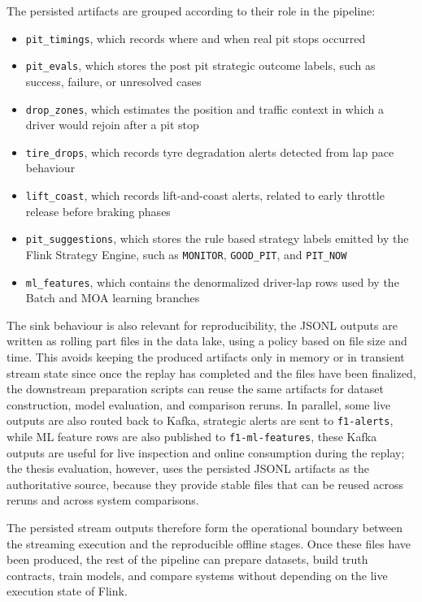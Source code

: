 The persisted artifacts are grouped according to their role in the pipeline:
\begin{itemize}
    \item \texttt{pit\_timings}, which records where and when real pit stops occurred
    \item \texttt{pit\_evals}, which stores the post pit strategic outcome labels, such as success, failure, or unresolved cases
    \item \texttt{drop\_zones}, which estimates the position and traffic context in which a driver would rejoin after a pit stop
    \item \texttt{tire\_drops}, which records tyre degradation alerts detected from lap pace behaviour
    \item \texttt{lift\_coast}, which records lift-and-coast alerts, related to early throttle release before braking phases
    \item \texttt{pit\_suggestions}, which stores the rule based strategy labels emitted by the Flink Strategy Engine, such as \texttt{MONITOR}, \texttt{GOOD\_PIT}, and \texttt{PIT\_NOW}
    \item \texttt{ml\_features}, which contains the denormalized driver-lap rows used by the Batch and MOA learning branches
\end{itemize}

The sink behaviour is also relevant for reproducibility, the JSONL outputs are written as rolling part files in the data lake, using a policy based on file size and time.
This avoids keeping the produced artifacts only in memory or in transient stream state since once the replay has completed and the files have been finalized, the downstream preparation
scripts can reuse the same artifacts for dataset construction, model evaluation, and comparison reruns.
In parallel, some live outputs are also routed back to Kafka, strategic alerts are sent to \texttt{f1-alerts}, while ML feature rows are also published to \texttt{f1-ml-features},
these Kafka outputs are useful for live inspection and online consumption during the replay; the thesis evaluation, however, uses the persisted JSONL artifacts as the authoritative
source, because they provide stable files that can be reused across reruns and across system comparisons.

The persisted stream outputs therefore form the operational boundary between the streaming execution and the reproducible offline stages. Once these files have been produced,
the rest of the pipeline can prepare datasets, build truth contracts, train models, and compare systems without depending on the live execution state of Flink.


